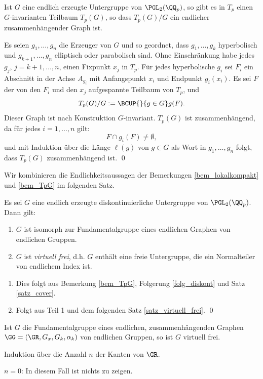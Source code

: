 \BEM\label{bem_TpG}
Ist $G$ eine endlich erzeugte Untergruppe von $\PGL_2(\QQ_p)$,
so gibt es in $T_p$ einen $G$-invarianten Teilbaum $T_p(G)$, so dass
$T_p(G)/G$ ein endlicher zusammenhängender Graph ist.

\bew Es seien $g_1,\ldots, g_n$ die Erzeuger von $G$ und so geordnet,
dass $g_1,\ldots,g_k$ hyperbolisch und $g_{k+1},\ldots,g_n$
elliptisch oder parabolisch sind.
Ohne Einschränkung habe jedes $g_j$, $j=k+1,\ldots,n$, einen Fixpunkt
$x_j$ in $T_p$.
Für jedes hyperbolische $g_i$ sei $F_i$ ein Abschnitt in der Achse
$A_{g_i}$ mit Anfangspunkt $x_i$ und Endpunkt $g_i(x_i)$.
Es sei $F$ der von den $F_i$ und den $x_j$ aufgespannte Teilbaum
von $T_p$, und
\[
T_p(G)/G := \BCUP{}{g\in G} g(F).
\]
Dieser Graph ist nach Konstruktion $G$-invariant.
$T_p(G)$ ist zusammenhängend, da für jedes $i=1,\ldots,n$ gilt:
\[
F \cap g_i(F) \neq \emptyset,
\]
und mit Induktion über die Länge $\ell(g)$ von $g\in G$ als Wort in
$g_1,\ldots,g_n$ folgt, dass $T_p(G)$ zusammenhängend ist.
\qed

Wir kombinieren die Endlichkeitsaussagen der Bemerkungen
\ref{bem_lokalkompakt} und \ref{bem_TpG} im folgenden Satz.

\SATZ Es sei $G$ eine endlich erzeugte diskontinuierliche
Untergruppe von $\PGL_2(\QQ_p)$. Dann gilt:
\begin{enumerate}
\item $G$ ist isomorph zur Fundamentalgruppe eines endlichen Graphen
von endlichen Gruppen.
\item $G$ ist \emph{virtuell frei},
d.h. $G$ enthält eine
freie Untergruppe, die ein Normalteiler von endlichem Index ist.
\end{enumerate}
\bew
\begin{enumerate}
\item Dies folgt aus Bemerkung \ref{bem_TpG}, Folgerung
\ref{folg_diskont} und Satz \ref{satz_cover}.
\item Folgt aus Teil 1 und dem folgenden Satz
\ref{satz_virtuell_frei}.
\qed
\end{enumerate}

\SATZ \label{satz_virtuell_frei}
Ist $G$ die Fundamentalgruppe eines endlichen, zusammenhängenden
Graphen $\GG=(\GR,G_x,G_k,\alpha_k)$ von endlichen Gruppen, so ist $G$
virtuell frei.

\bew Induktion über die Anzahl $n$ der Kanten von $\GR$.

$n=0$: In diesem Fall ist nichts zu zeigen.

